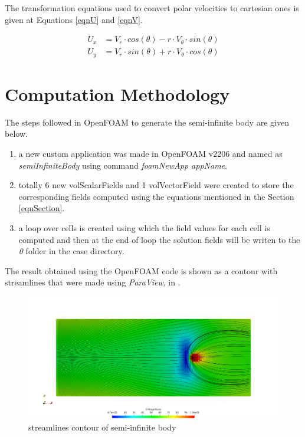\documentclass[12pt]{article}
\begin{document}
The transformation equations used to convert polar velocities to cartesian ones
is given at Equations \ref{eqnU} and \ref{eqnV}.

\begin{align}
	U_x & = V_r \cdot cos(\theta) - r \cdot V_{\theta} \cdot sin(\theta) \label{eqnU} \\
	U_y & = V_r \cdot sin(\theta) + r \cdot V_{\theta} \cdot cos(\theta) \label{eqnV}
\end{align}

\section{Computation Methodology}
The steps followed in OpenFOAM to generate the semi-infinite body are given below.


\begin{enumerate}
	\item a new custom application was made in OpenFOAM v2206 and named as \emph{semiInfiniteBody} using command \emph{foamNewApp appName}.
	\item totally 6 new volScalarFields and 1 volVectorField were created to store the corresponding fields computed using the equations mentioned in the Section \ref{eqnSection}.
	\item a loop over cells is created using which the field values for each cell is computed and then at the end of loop the solution fields will be writen to the \emph{0} folder in the case directory.
\end{enumerate}

The result obtained using the OpenFOAM code is shown as a contour with streamlines that were made using \emph{ParaView}, in .

\begin{figure}
	\includegraphics[scale=0.3]{streamlines.png}
	\caption{streamlines contour of semi-infinite body}
	\label{fig:contour}
\end{figure}
\end{document}
